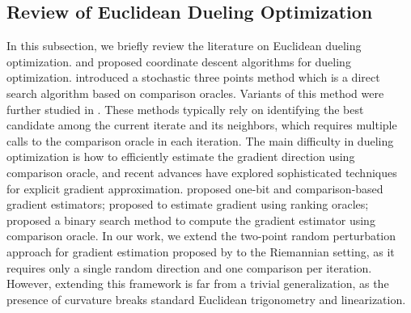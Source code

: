 \documentclass{article}
\theoremstyle{plain}
\theoremstyle{definition}
\theoremstyle{remark}
\begin{document}
\subsection{Review of Euclidean Dueling Optimization}


In this subsection, we briefly review the literature on Euclidean dueling optimization. \cite{lobanov2024acceleration} and \cite{chervonenkis2024nesterov} proposed coordinate descent algorithms for dueling optimization. \cite{bergou2020stochastic} introduced a stochastic three points method which is a direct search algorithm based on comparison oracles. Variants of this method were further studied in \citep{boucherouite2024minibatch,kadi2025almost,tkachenkothree}. These methods typically rely on identifying the best candidate among the current iterate and its neighbors, which requires multiple calls to the comparison oracle in each iteration. The main difficulty in dueling optimization is how to efficiently estimate the gradient direction using comparison oracle, and recent advances have explored sophisticated techniques for explicit gradient approximation. \cite{Cai_2022} proposed one-bit and comparison-based gradient estimators; \cite{tang2024zerothorder} proposed to estimate gradient using ranking oracles; \cite{zhang2024comparisons} proposed a binary search method to compute the gradient estimator using comparison oracle. In our work, we extend the two-point random perturbation approach for gradient estimation proposed by \citet{pmlr-v139-saha21b} to the Riemannian setting, as it requires only a single random direction and one comparison per iteration. However, extending this framework is far from a trivial generalization, as the presence of curvature breaks standard Euclidean trigonometry and linearization.
\end{document}
